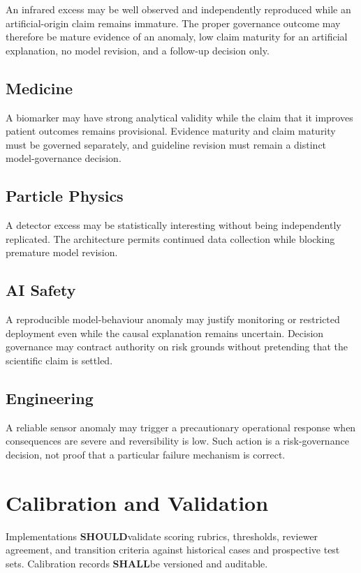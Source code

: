 \documentclass[11pt,a4paper]{article}
\newcommand{\shall}{\textbf{SHALL}}
\newcommand{\should}{\textbf{SHOULD}}
\begin{document}
An infrared excess may be well observed and independently reproduced while an artificial-origin claim remains immature. The proper governance outcome may therefore be mature evidence of an anomaly, low claim maturity for an artificial explanation, no model revision, and a follow-up decision only.

\subsection{Medicine}

A biomarker may have strong analytical validity while the claim that it improves patient outcomes remains provisional. Evidence maturity and claim maturity must be governed separately, and guideline revision must remain a distinct model-governance decision.

\subsection{Particle Physics}

A detector excess may be statistically interesting without being independently replicated. The architecture permits continued data collection while blocking premature model revision.

\subsection{AI Safety}

A reproducible model-behaviour anomaly may justify monitoring or restricted deployment even while the causal explanation remains uncertain. Decision governance may contract authority on risk grounds without pretending that the scientific claim is settled.

\subsection{Engineering}

A reliable sensor anomaly may trigger a precautionary operational response when consequences are severe and reversibility is low. Such action is a risk-governance decision, not proof that a particular failure mechanism is correct.

\section{Calibration and Validation}

Implementations \should validate scoring rubrics, thresholds, reviewer agreement, and transition criteria against historical cases and prospective test sets. Calibration records \shall be versioned and auditable.
\end{document}

